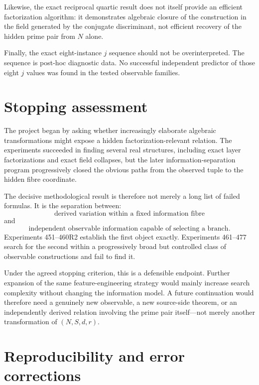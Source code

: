 \documentclass[11pt,a4paper]{article}
\begin{document}
Likewise, the exact reciprocal quartic result does not itself provide an efficient factorization algorithm: it demonstrates algebraic closure of the construction in the field generated by the conjugate discriminant, not efficient recovery of the hidden prime pair from $N$ alone.

Finally, the exact eight-instance $j$ sequence should not be overinterpreted. The sequence is post-hoc diagnostic data. No successful independent predictor of those eight $j$ values was found in the tested observable families.

\section{Stopping assessment}

The project began by asking whether increasingly elaborate algebraic transformations might expose a hidden factorization-relevant relation. The experiments succeeded in finding several real structures, including exact layer factorizations and exact field collapses, but the later information-separation program progressively closed the obvious paths from the observed tuple to the hidden fibre coordinate.

The decisive methodological result is therefore not merely a long list of failed formulas. It is the separation between:
\begin{equation}
\text{derived variation within a fixed information fibre}
\end{equation}
and
\begin{equation}
\text{independent observable information capable of selecting a branch}.
\end{equation}
Experiments 451--460R2 establish the first object exactly. Experiments 461--477 search for the second within a progressively broad but controlled class of observable constructions and fail to find it.

Under the agreed stopping criterion, this is a defensible endpoint. Further expansion of the same feature-engineering strategy would mainly increase search complexity without changing the information model. A future continuation would therefore need a genuinely new observable, a new source-side theorem, or an independently derived relation involving the prime pair itself—not merely another transformation of $(N,S,d,r)$.

\section{Reproducibility and error corrections}
\end{document}
